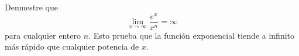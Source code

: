 \item Demuestre que
    $$\lim_{x \to \infty} \frac{e^x}{x^n} = \infty$$
    para cualquier entero $n$. Esto prueba que la función exponencial tiende a infinito más rápido que cualquier potencia de $x$.
